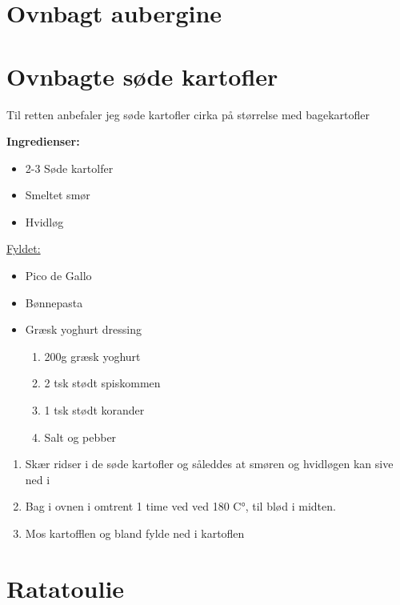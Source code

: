 \documentclass{book}
\begin{document}
{\section{Ovnbagt aubergine}
\begin{minipage}[t]{0.5\textwidth}
\end{minipage}
\begin{minipage}[t]{0.5\textwidth}
\end{minipage}
\newpage \section{Ovnbagte søde kartofler}
Til retten anbefaler jeg søde kartofler cirka på størrelse med bagekartofler\\
\begin{minipage}[t]{0.5\textwidth}
\textbf{Ingredienser:}
\begin{itemize}
    \item 2-3 Søde kartolfer
    \item Smeltet smør
    \item Hvidløg
\end{itemize}
\underline{Fyldet:}
\begin{itemize}
    \item Pico de Gallo
    \item Bønnepasta
    \item Græsk yoghurt dressing
    \begin{enumerate}
        \item 200g græsk yoghurt 
        \item 2 tsk stødt spiskommen
        \item 1 tsk stødt korander
        \item Salt og pebber
    \end{enumerate}
\end{itemize}
\end{minipage}
\begin{minipage}[t]{0.5\textwidth}
\begin{enumerate}
    \item Skær ridser i de søde kartofler og såleddes at smøren og hvidløgen kan sive ned i
    \item Bag i ovnen i omtrent 1 time ved ved 180 C°, til blød i midten.
    \item Mos kartofflen og bland fylde ned i kartoflen 
\end{enumerate}
\end{minipage}
\newpage \section{Ratatoulie}
\begin{minipage}[t]{0.5\textwidth}
\end{minipage}
\begin{minipage}[t]{0.5\textwidth}
\end{minipage}
}
\end{document}

